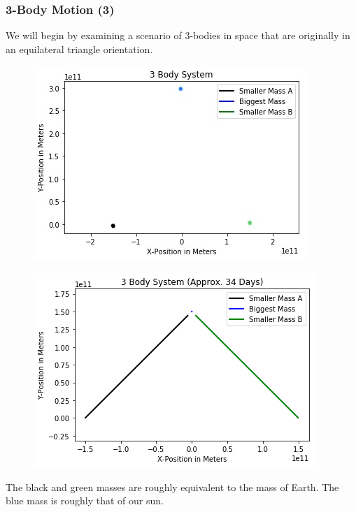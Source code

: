 \documentclass{beamer}
\begin{document}
\begin{frame}
\frametitle{3-Body Motion (3)}
We will begin by examining a scenario of 3-bodies in space that are originally in an equilateral triangle orientation.
\begin{multicols}{2}
\begin{figure}
\begin{center}
\includegraphics[width=1.0\linewidth]{3BodyDynamics1.png}
\end{center}
\end{figure}
\begin{figure}
\begin{center}
\includegraphics[width=1.0\linewidth]{3BodyDynamics2.png}
\end{center}
\end{figure}
\end{multicols}
The black and green masses are roughly equivalent to the mass of Earth. The blue mass is roughly that of our sun.
\end{frame}
\end{document}
